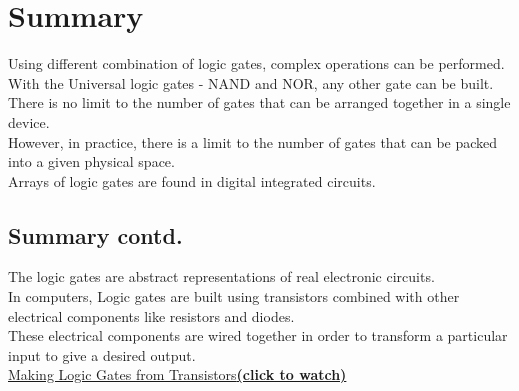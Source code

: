 \documentclass{article}
\begin{document}
\section{Summary}
Using different combination of logic gates, complex operations can be performed.\cite{grace2020} \\
With the Universal logic gates - NAND and NOR, any other gate can be built.\\
There is no limit to the number of gates that can be arranged together in a single device.\\
However, in practice, there is a limit to the number of gates that can be packed into a given physical space. 
\\
Arrays of logic gates are found in digital integrated circuits.
\\
\newpage
\subsection{Summary contd.}
The logic gates are abstract representations of real electronic circuits.\cite{grace2021study}\\
In computers, Logic gates are built using transistors combined with other electrical components like resistors and diodes. \\
These electrical components are wired together in order to transform a particular input to give a desired output.\\
\href{https://www.youtube.com/watch?v=sTu3LwpF6XI&t=481s}{Making Logic Gates from Transistors\textbf{(click to watch)}}
\newpage
\end{document}

